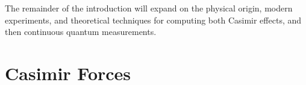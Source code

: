 

The remainder of the introduction will expand on the physical origin, modern experiments, and theoretical
techniques for computing both Casimir effects, and then continuous quantum measurements.  



\section{Casimir Forces}%

